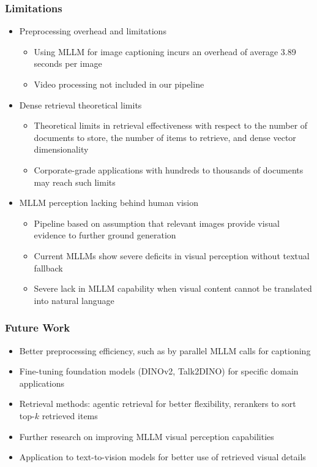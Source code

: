 \documentclass[aspectratio=1610]{beamer}
\begin{document}
    \begin{frame}
        \frametitle{Limitations}
        \begin{itemize}
            \item Preprocessing overhead and limitations
                \begin{itemize}
                    \item Using MLLM for image captioning incurs an overhead of average 3.89 seconds per image
                    \item Video processing not included in our pipeline
                \end{itemize}
            \item Dense retrieval theoretical limits
                \begin{itemize}
                    \item Theoretical limits in retrieval effectiveness with respect to the number of documents to store, the number of items to retrieve, and dense vector dimensionality
                    \item Corporate-grade applications with hundreds to thousands of documents may reach such limits
                \end{itemize}
            \item MLLM perception lacking behind human vision
                \begin{itemize}
                    \item Pipeline based on assumption that relevant images provide visual evidence to further ground generation
                    \item Current MLLMs show severe deficits in visual perception without textual fallback
                    \item Severe lack in MLLM capability when visual content cannot be translated into natural language
                \end{itemize}
        \end{itemize}
    \end{frame}

    \begin{frame}
        \frametitle{Future Work}
        \begin{itemize}
            \item Better preprocessing efficiency, such as by parallel MLLM calls for captioning
            \item Fine-tuning foundation models (DINOv2, Talk2DINO) for specific domain applications
            \item Retrieval methods: agentic retrieval for better flexibility, rerankers to sort top-$k$ retrieved items
            \item Further research on improving MLLM visual perception capabilities
            \item Application to text-to-vision models for better use of retrieved visual details
        \end{itemize}
    \end{frame}
\end{document}
